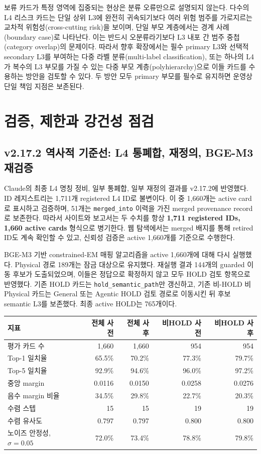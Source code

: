 \documentclass[11pt,a4paper]{article}
\newcommand{\code}[1]{\texttt{#1}}
\begin{document}
보류 카드가 특정 영역에 집중되는 현상은 분류 오류만으로 설명되지 않는다.
다수의 L4 리스크 카드는 단일 상위 L3에 완전히 귀속되기보다 여러 위험 범주를
가로지르는 교차적 위험성(cross-cutting risk)을 보이며, 단일 부모 계층에서는
경계 사례(boundary case)로 나타난다. 이는 반드시 오분류라기보다 L3 내포 간
범주 중첩(category overlap)의 문제이다. 따라서 향후 확장에서는 필수 primary
L3와 선택적 secondary L3를 부여하는 다중 라벨 분류(multi-label
classification), 또는 하나의 L4가 복수의 L3 부모를 가질 수 있는 다중 부모
계층(polyhierarchy)으로 이들 카드를 수용하는 방안을 검토할 수 있다. 두 방안
모두 primary 부모를 필수로 유지하면 운영상 단일 책임 지점은 보존된다.

\section{검증, 제한과 강건성 점검}

\subsection{v2.17.2 역사적 기준선: L4 통폐합, 재정의, BGE-M3 재검증}

Claude의 최종 L4 명칭 정비, 일부 통폐합, 일부 재정의 결과를 v2.17.2에 반영했다.
ID 레지스트리는 1,711개 registered L4 ID로 불변이다. 이 중 1,660개는 active
card로 표시하고 검증하며, 51개는 \code{merged\_into} 이력을 가진 merged
provenance record로 보존한다. 따라서 사이트와 보고서는 두 수치를 항상
\textbf{1,711 registered IDs, 1,660 active cards} 형식으로 병기한다. 웹
탐색에서는 merged 배지를 통해 retired ID도 계속 확인할 수 있고, 신뢰성 검증은
active 1,660개를 기준으로 수행한다.

BGE-M3 기반 constrained-EM 매핑 알고리즘을 active 1,660개에 대해 다시 실행했다.
Physical 경로 189개는 잠금 대상으로 유지했다. 재실행 결과 144개의 guarded 이동
후보가 도출되었으며, 이들은 정답으로 확정하지 않고 모두 HOLD 검토 항목으로
반영했다. 기존 HOLD 카드는 \code{hold\_semantic\_path}만 갱신하고, 기존
비-HOLD 비Physical 카드는 General 또는 Agentic HOLD 검토 경로로 이동시킨 뒤
후보 semantic L3를 보존했다. 최종 active HOLD는 765개이다.

\begin{longtable}{lrrrr}
\toprule
지표 & 전체 사전 & 전체 사후 & 비HOLD 사전 & 비HOLD 사후 \\
\midrule
\endhead
평가 카드 수 & 1,660 & 1,660 & 954 & 954 \\
Top-1 일치율 & 65.5\% & 70.2\% & 77.3\% & 79.7\% \\
Top-5 일치율 & 92.9\% & 94.6\% & 96.0\% & 97.2\% \\
중앙 margin & 0.0116 & 0.0150 & 0.0258 & 0.0276 \\
음수 margin 비율 & 34.5\% & 29.8\% & 22.7\% & 20.3\% \\
수렴 스텝 & 15 & 15 & 19 & 19 \\
수렴 유사도 & 0.797 & 0.797 & 0.800 & 0.800 \\
노이즈 안정성, $\sigma=0.05$ & 72.0\% & 73.4\% & 78.8\% & 79.8\% \\
\bottomrule
\end{longtable}
\end{document}
